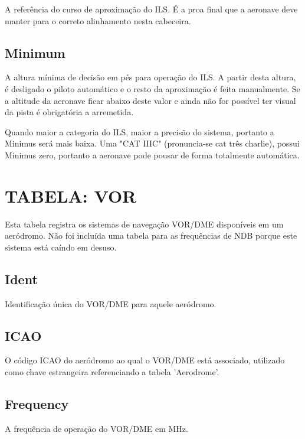 A referência do curso de aproximação do ILS. É a proa final que a aeronave deve 
manter para o correto alinhamento nesta cabeceira.

\subsection{Minimum}

A altura mínima de decisão em pés para operação do ILS. A partir desta altura, é
desligado o piloto automático e o resto da aproximação é feita manualmente.
Se a altitude da aeronave ficar abaixo deste valor e ainda não for possível 
ter visual da pista é obrigatória a arremetida.

Quando maior a categoria do ILS, maior a precisão do sistema, portanto a Minimus 
será mais baixa. Uma "CAT IIIC" (pronuncia-se cat três charlie), possui Minimus zero, 
portanto a aeronave pode pousar de forma totalmente automática.

\section{TABELA: VOR}

Esta tabela registra os sistemas de navegação VOR/DME disponíveis em um aeródromo.
Não foi incluída uma tabela para as frequências de NDB porque este sistema
está caíndo em desuso.

\subsection{Ident}
Identificação única do VOR/DME para aquele aeródromo.

\subsection{ICAO}
O código ICAO do aeródromo ao qual o VOR/DME está associado, utilizado como 
chave estrangeira referenciando a tabela 'Aerodrome'.

\subsection{Frequency}
A frequência de operação do VOR/DME em MHz.